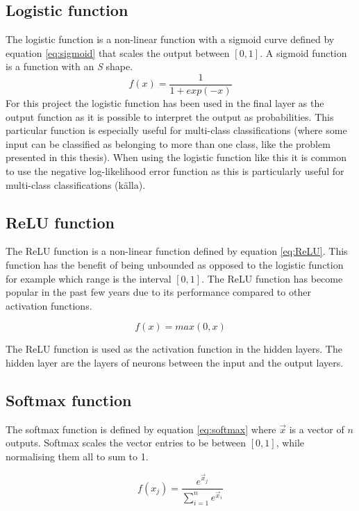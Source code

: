 \subsection{Logistic function}\label{sec:sigmoid_function}
The logistic function is a non-linear function with a sigmoid curve defined by equation \ref{eq:sigmoid} that scales the output between $[0, 1]$. A sigmoid function is a function with an \textit{S} shape.
\begin{equation}\label{eq:sigmoid}
    f(x)=\frac{1}{1+exp(-x)}
\end{equation}
For this project the logistic function has been used in the final layer as the output function as it is possible to interpret the output as probabilities. This particular function is especially useful for multi-class classifications (where some input can be classified as belonging to more than one class, like the problem presented in this thesis). When using the logistic function like this it is common to use the negative log-likelihood error function as this is particularly useful for multi-class classifications (källa).

\subsection{ReLU function}
The ReLU function is a non-linear function defined by equation \ref{eq:ReLU}. This function has the benefit of being unbounded as opposed to the logistic function for example which range is the interval $[0, 1]$. The ReLU function has become popular in the past few years due to its performance compared to other activation functions. \parencite{glorot2011deep}

\begin{equation}\label{eq:ReLU}
    f(x) = max(0,x)
\end{equation}

The ReLU function is used as the activation function in the hidden layers. The hidden layer are the layers of neurons between the input and the output layers.
\subsection{Softmax function}\label{sec:softmax_function}
The softmax function is defined by equation \ref{eq:softmax} where $\vec{x}$ is a vector of $n$ outputs. Softmax scales the vector entries to be between $[0,1]$, while normalising them all to sum to 1.

\begin{equation} \label{eq:softmax}
    f(x_j) = \frac{e^{\vec{x}_j}}{\sum_{i=1}^{n} e^{\vec{x}_i}}
\end{equation}


